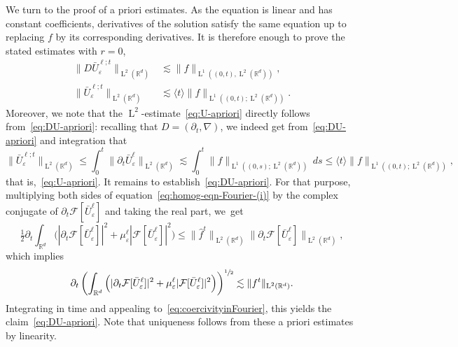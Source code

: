 \documentclass[10pt]{amsart}
\theoremstyle{plain}
\theoremstyle{definition}
\numberwithin{equation}{section}
\newcommand{\e}{\varepsilon}
\newcommand{\R}{\mathbb R}
\newcommand{\F}{\mathcal F}
\newcommand{\Ld}{\operatorname{L}}
\begin{document}
We turn to the proof of a priori estimates. As the equation is linear and has constant coefficients, derivatives of the solution satisfy the same equation up to replacing $f$ by its corresponding derivatives. It is therefore enough
to prove the stated estimates with $r=0$,
\begin{align}
\|D\bar U_\e^{\ell;t}\|_{\Ld^2(\R^d)}&\lesssim\|f\|_{\Ld^1((0,t),\Ld^2(\R^d))},\label{eq:DU-apriori}\\
\|\bar U_\e^{\ell;t}\|_{\Ld^2(\R^d)}&\lesssim\langle t\rangle\|f\|_{\Ld^1((0,t);\Ld^2(\R^d))}.\label{eq:U-apriori}
\end{align}
Moreover, we note that the $\Ld^2$-estimate~\eqref{eq:U-apriori} directly follows from~\eqref{eq:DU-apriori}: recalling that $D=(\partial_t,\nabla)$, we indeed get from~\eqref{eq:DU-apriori} and integration that
\begin{equation*}
\|\bar U_{\e}^{\ell;t}\|_{\Ld^2(\R^d)}\le \int_{0}^t\|\partial_t \bar U_{\e}^{\ell}\|_{\Ld^2(\R^d)}\lesssim \int_{0}^t\|f\|_{\Ld^1((0,s);\Ld^2(\R^d))}\,ds\le \langle t\rangle \|f\|_{\Ld^1((0,t);\Ld^2(\R^d))},
\end{equation*}
that is,~\eqref{eq:U-apriori}.
It remains to establish~\eqref{eq:DU-apriori}. For that purpose, multiplying both sides of equation~\eqref{eq:homog-eqn-Fourier-(i)} by {the complex conjugate of} $\partial_t\F[\bar U_\e^\ell]$ {and taking the real part}, we~get
\begin{equation*}
\tfrac{1}{2}\partial_t\int_{\R^d}\Big(|\partial_t\F[\bar U_\e^\ell]|^2+\mu^{\ell}_{\e}|\F[\bar U_\e^\ell]|^2\Big)\le \|\hat f^t\|_{\Ld^2(\R^d)}\|\partial_t\F[\bar U_\e^\ell]\|_{\Ld^2(\R^d)},
\end{equation*}
which implies
\begin{equation*}
\partial_t\left(\int_{\R^d}\Big(|\partial_t\F[\bar U_\e^\ell]|^2+\mu^{\ell}_{\e}|\F[\bar U_\e^\ell]|^2\Big)\right)^{\sfrac{1}{2}}\lesssim \|f^t\|_{\Ld^2(\R^d)}.
\end{equation*}
Integrating in time and appealing to~\eqref{eq:coercivityinFourier}, this yields the claim~\eqref{eq:DU-apriori}.
Note that uniqueness follows from these a priori estimates by linearity.
\end{document}
